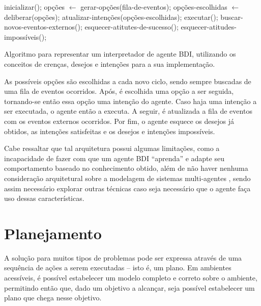 \begin{algorithm}[htb] \begin{center}
	\begin{algorithmic}[1] \STATE inicializar(); \STATE {} \STATE
	opções $\gets$ gerar-opções(fila-de-eventos); \STATE opções-escolhidas
	$\gets$ deliberar(opções); \STATE atualizar-intenções(opções-escolhidas);
	\STATE executar(); \STATE buscar-novos-eventos-externos(); \STATE
	esquecer-atitutes-de-sucesso(); \STATE esquecer-atitudes-impossíveis();
	\ENDWHILE \end{algorithmic} \end{center} \caption[Algoritmo para representar
	um interpretador de agente BDI.] {\label{alg:BDIINTERPRETERALG} Algoritmo
	para representar um interpretador de agente BDI, utilizando os conceitos de
	crenças, desejos e intenções para a sua implementação.} \end{algorithm}

As possíveis opções são escolhidas a cada novo ciclo, sendo sempre buscadas de
uma fila de eventos ocorridos. Após, é escolhida uma opção a ser seguida,
tornando-se então essa opção uma intenção do agente. Caso haja uma intenção a
ser executada, o agente então a executa. A seguir, é atualizada a fila de
eventos com os eventos externos ocorridos. Por fim, o agente esquece os desejos
já obtidos, as intenções satisfeitas e os desejos e intenções impossíveis.

Cabe ressaltar que tal arquitetura possui algumas limitações, como a
incapacidade de fazer com que um agente BDI ``aprenda'' e adapte seu
comportamento baseado no conhecimento obtido, além de não haver nenhuma
consideração arquitetural sobre a modelagem de sistemas multi-agentes
\cite{Georgeff:1998:BMA:648205.749450}, sendo assim necessário explorar
outras técnicas caso seja necessário que o agente faça uso dessas
características.


\section{Planejamento}
A solução para muitos tipos de problemas pode ser expressa através de uma
sequência de ações a serem executadas -- isto é, um plano. Em ambientes
acessíveis, é possível estabelecer um modelo completo e correto sobre o
ambiente, permitindo então que, dado um objetivo a alcançar, seja possível
estabelecer um plano que chega nesse objetivo.

